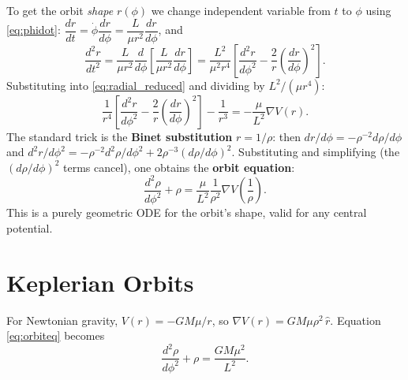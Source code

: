 \documentclass[11pt]{article}
\newcommand{\rhat}{\hat r}
\begin{document}
To get the orbit \emph{shape} $r(\phi)$ we change independent variable from $t$ to $\phi$ using \eqref{eq:phidot}: $\dfrac{dr}{dt}=\dot\phi\dfrac{dr}{d\phi}=\dfrac{L}{\mu r^2}\dfrac{dr}{d\phi}$, and
\[
\frac{d^2r}{dt^2}=\frac{L}{\mu r^2}\frac{d}{d\phi}\!\left[\frac{L}{\mu r^2}\frac{dr}{d\phi}\right]
=\frac{L^2}{\mu^2 r^4}\left[\frac{d^2r}{d\phi^2}-\frac{2}{r}\left(\frac{dr}{d\phi}\right)^2\right].
\]
Substituting into \eqref{eq:radial_reduced} and dividing by $L^2/(\mu r^4)$:
\[
\frac{1}{r^4}\left[\frac{d^2r}{d\phi^2}-\frac{2}{r}\left(\frac{dr}{d\phi}\right)^2\right]-\frac{1}{r^3}=-\frac{\mu}{L^2}\nabla V(r).
\]
The standard trick is the \textbf{Binet substitution} $r=1/\rho$: then $dr/d\phi=-\rho^{-2}d\rho/d\phi$ and $d^2r/d\phi^2=-\rho^{-2}d^2\rho/d\phi^2+2\rho^{-3}(d\rho/d\phi)^2$. Substituting and simplifying (the $(d\rho/d\phi)^2$ terms cancel), one obtains the \textbf{orbit equation}:
\begin{equation}
\boxed{\frac{d^2\rho}{d\phi^2}+\rho = \frac{\mu}{L^2}\frac{1}{\rho^2}\nabla V\!\left(\frac1\rho\right).} \label{eq:orbiteq}
\end{equation}
This is a purely geometric ODE for the orbit's shape, valid for any central potential.

\section{Keplerian Orbits}

For Newtonian gravity, $V(r)=-GM\mu/r$, so $\nabla V(r) = GM\mu\rho^2\,\rhat$. Equation \eqref{eq:orbiteq} becomes
\[
\frac{d^2\rho}{d\phi^2}+\rho =\frac{GM\mu^2}{L^2}.
\]
\end{document}
